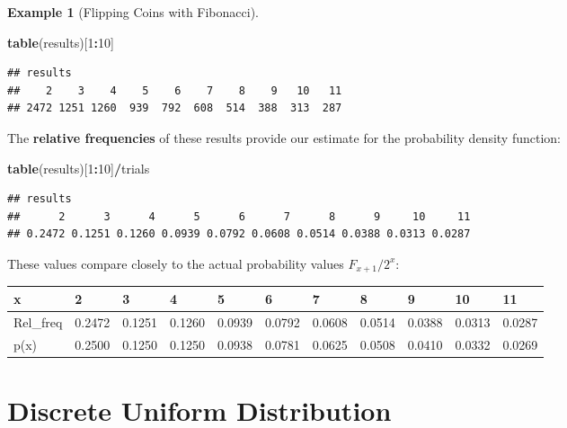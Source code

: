 \documentclass[
]{book}
\newenvironment{Shaded}{\begin{snugshade}}{\end{snugshade}}
\newcommand{\DecValTok}[1]{\textcolor[rgb]{0.00,0.00,0.81}{#1}}
\newcommand{\FunctionTok}[1]{\textcolor[rgb]{0.13,0.29,0.53}{\textbf{#1}}}
\newcommand{\NormalTok}[1]{#1}
\newcommand{\SpecialCharTok}[1]{\textcolor[rgb]{0.81,0.36,0.00}{\textbf{#1}}}
\theoremstyle{definition}
\theoremstyle{definition}
\newtheorem{example}{Example}[chapter]
\theoremstyle{definition}
\theoremstyle{definition}
\theoremstyle{remark}
\begin{document}
\begin{example}[Flipping Coins with Fibonacci]
\begin{Shaded}
\begin{Highlighting}[]
\FunctionTok{table}\NormalTok{(results)[}\DecValTok{1}\SpecialCharTok{:}\DecValTok{10}\NormalTok{]}
\end{Highlighting}
\end{Shaded}

\begin{verbatim}
## results
##    2    3    4    5    6    7    8    9   10   11 
## 2472 1251 1260  939  792  608  514  388  313  287
\end{verbatim}

The \textbf{relative frequencies} of these results provide our estimate for the probability density function:

\begin{Shaded}
\begin{Highlighting}[]
\FunctionTok{table}\NormalTok{(results)[}\DecValTok{1}\SpecialCharTok{:}\DecValTok{10}\NormalTok{]}\SpecialCharTok{/}\NormalTok{trials}
\end{Highlighting}
\end{Shaded}

\begin{verbatim}
## results
##      2      3      4      5      6      7      8      9     10     11 
## 0.2472 0.1251 0.1260 0.0939 0.0792 0.0608 0.0514 0.0388 0.0313 0.0287
\end{verbatim}

These values compare closely to the actual probability values \(F_{x+1}/2^x\):

\begin{table}
\centering
\begin{tabular}{l|l|l|l|l|l|l|l|l|l|l}
\hline
x & 2 & 3 & 4 & 5 & 6 & 7 & 8 & 9 & 10 & 11\\
\hline
Rel\_freq & 0.2472 & 0.1251 & 0.1260 & 0.0939 & 0.0792 & 0.0608 & 0.0514 & 0.0388 & 0.0313 & 0.0287\\
\hline
p(x) & 0.2500 & 0.1250 & 0.1250 & 0.0938 & 0.0781 & 0.0625 & 0.0508 & 0.0410 & 0.0332 & 0.0269\\
\hline
\end{tabular}
\end{table}

\end{example}

\section{Discrete Uniform Distribution}\label{discrete-uniform-distribution}
\end{document}
